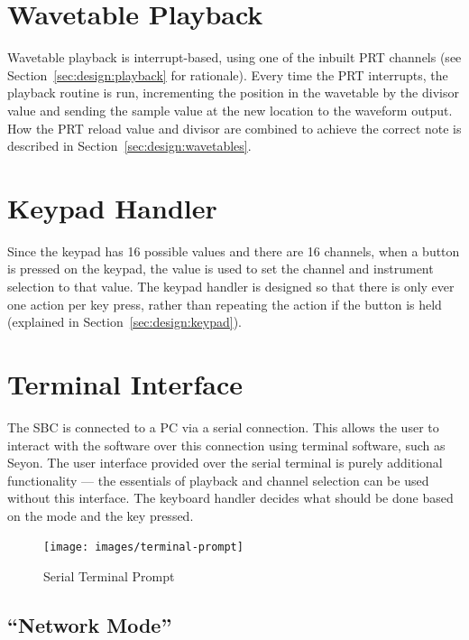 \section{Wavetable Playback}
\label{sec:overview:playback}

Wavetable playback is interrupt-based, using one of the inbuilt PRT channels (see 
Section~\ref{sec:design:playback} for rationale).  Every time the PRT interrupts, the playback 
routine is run, incrementing the position in the wavetable by the divisor value and sending the 
sample value at the new location to the waveform output.  How the PRT reload value and divisor are 
combined to achieve the correct note is described in Section~\ref{sec:design:wavetables}.

\section{Keypad Handler}
\label{sec:overview:keypad}

Since the keypad has 16 possible values and there are 16 channels, when a button is pressed on the 
keypad, the value is used to set the channel and instrument selection to that value.  The keypad 
handler is designed so that there is only ever one action per key press, rather than repeating the 
action if the button is held (explained in Section~\ref{sec:design:keypad}).

\section{Terminal Interface}
\label{sec:overview:terminal}

The SBC is connected to a PC via a serial connection.  This allows the user to interact with the 
software over this connection using terminal software, such as Seyon.  The user interface provided 
over the serial terminal is purely additional functionality --- the essentials of playback and 
channel selection can be used without this interface.  The keyboard handler decides what should be 
done based on the mode and the key pressed.

\begin{figure}[htb]
\centering
\texttt{[image: images/terminal-prompt]}
\caption{Serial Terminal Prompt}\label{fig:terminal-prompt}
\end{figure}

\subsection{``Network Mode''}

